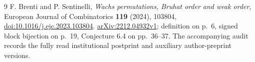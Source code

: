 \documentclass[11pt]{article}
\begin{document}
\begin{thebibliography}{9}
 F. Brenti and P. Sentinelli,
\emph{Wachs permutations, Bruhat order and weak order},
European Journal of Combinatorics \textbf{119} (2024), 103804,
\href{https://doi.org/10.1016/j.ejc.2023.103804}{doi:10.1016/j.ejc.2023.103804}.
\href{https://arxiv.org/abs/2212.04932}{arXiv:2212.04932v1};
definition on p.~6, signed block bijection on p.~19, Conjecture 6.4
on pp.~36--37. The accompanying audit records the fully read
institutional postprint and auxiliary author-preprint versions.
\end{thebibliography}
\end{document}
